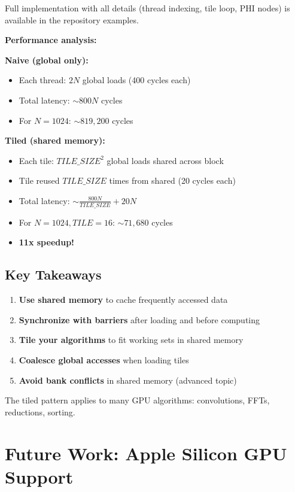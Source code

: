 \documentclass[11pt,oneside]{book}
\begin{document}
Full implementation with all details (thread indexing, tile loop, PHI nodes) is available in the repository examples.

\textbf{Performance analysis:}

\textbf{Naive (global only):}
\begin{itemize}[noitemsep]
  \item Each thread: $2N$ global loads (400 cycles each)
  \item Total latency: $\sim 800N$ cycles
  \item For $N=1024$: $\sim 819,200$ cycles
\end{itemize}

\textbf{Tiled (shared memory):}
\begin{itemize}[noitemsep]
  \item Each tile: $TILE\_SIZE^2$ global loads shared across block
  \item Tile reused $TILE\_SIZE$ times from shared (20 cycles each)
  \item Total latency: $\sim \frac{800N}{TILE\_SIZE} + 20N$
  \item For $N=1024, TILE=16$: $\sim 71,680$ cycles
  \item \textbf{11x speedup!}
\end{itemize}

\section{Key Takeaways}

\begin{enumerate}[noitemsep]
  \item \textbf{Use shared memory} to cache frequently accessed data
  \item \textbf{Synchronize with barriers} after loading and before computing
  \item \textbf{Tile your algorithms} to fit working sets in shared memory
  \item \textbf{Coalesce global accesses} when loading tiles
  \item \textbf{Avoid bank conflicts} in shared memory (advanced topic)
\end{enumerate}

The tiled pattern applies to many GPU algorithms: convolutions, FFTs, reductions, sorting.

\chapter{Future Work: Apple Silicon GPU Support}
\end{document}
